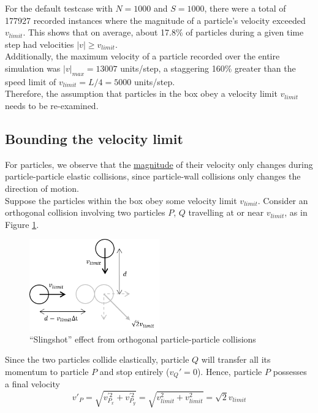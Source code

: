 \documentclass[12pt]{article}
\begin{document}
For the default testcase with $N=1000$ and $S=1000$, there were a total of 177927 recorded instances where the magnitude of a particle’s velocity exceeded $v_{limit}$. This shows that on average, about 17.8\% of particles during a given time step had velocities $\left|v\right| \geq v_{limit}$. \\

Additionally, the maximum velocity of a particle recorded over the entire simulation was $\left|v\right|_{max} = 13007$ units/step, a staggering 160\% greater than the speed limit of $v_{limit} = L/4 = 5000$ units/step. \\

Therefore, the assumption that particles in the box obey a velocity limit $v_{limit}$ needs to be re-examined.

\subsection{Bounding the velocity limit}

For particles, we observe that the \ul{magnitude} of their velocity only changes during particle-particle elastic collisions, since particle-wall collisions only changes the direction of motion. \\

Suppose the particles within the box obey some velocity limit $v_{limit}$. Consider an orthogonal collision involving two particles $P$, $Q$ travelling at or near $v_{limit}$, as in Figure \ref{fig:chap8Slingshot}. \\

\begin{figure}[H]
    \centering
    \includegraphics[width=0.5\textwidth]{chap8Slingshot}
    \caption{``Slingshot'' effect from orthogonal particle-particle collisions}
    \label{fig:chap8Slingshot}
\end{figure}

Since the two particles collide elastically, particle $Q$ will transfer all its momentum to particle $P$ and stop entirely ($v_Q' = 0$). Hence, particle $P$ possesses a final velocity
$$v'_P = \sqrt{v_{P_x}^{'2} + v_{P_y}^{'2}} = \sqrt{v_{limit}^2 + v_{limit}^2} = \sqrt{2}v_{limit}$$
\end{document}
